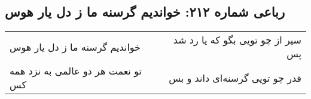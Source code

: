 \begin{center}
\section*{رباعی شماره ۲۱۲: خواندیم گرسنه ما ز دل یار هوس}
\label{sec:sh212}
\begin{longtable}{l p{0.5cm} r}
خواندیم گرسنه ما ز دل یار هوس
&&
سیر از چو تویی بگو که یا رد شد پس
\\
تو نعمت هر دو عالمی به نزد همه کس
&&
قدر چو تویی گرسنه‌ای داند و بس
\\
\end{longtable}
\end{center}
